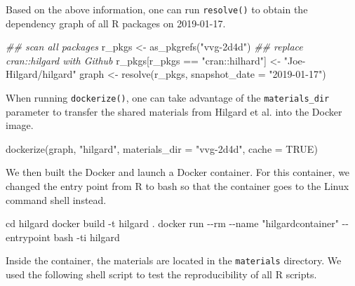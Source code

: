 \documentclass[
  10pt,
  letterpaper,
]{article}
\newenvironment{Shaded}{\begin{snugshade}}{\end{snugshade}}
\newcommand{\AttributeTok}[1]{\textcolor[rgb]{0.40,0.45,0.13}{#1}}
\newcommand{\ConstantTok}[1]{\textcolor[rgb]{0.56,0.35,0.01}{#1}}
\newcommand{\DocumentationTok}[1]{\textcolor[rgb]{0.37,0.37,0.37}{\textit{#1}}}
\newcommand{\FunctionTok}[1]{\textcolor[rgb]{0.28,0.35,0.67}{#1}}
\newcommand{\NormalTok}[1]{\textcolor[rgb]{0.00,0.23,0.31}{#1}}
\newcommand{\OtherTok}[1]{\textcolor[rgb]{0.00,0.23,0.31}{#1}}
\newcommand{\SpecialCharTok}[1]{\textcolor[rgb]{0.37,0.37,0.37}{#1}}
\newcommand{\StringTok}[1]{\textcolor[rgb]{0.13,0.47,0.30}{#1}}
\begin{document}
Based on the above information, one can run \texttt{resolve()} to obtain
the dependency graph of all R packages on 2019-01-17.

\begin{Shaded}
\begin{Highlighting}[]
\DocumentationTok{\#\# scan all packages}
\NormalTok{r\_pkgs }\OtherTok{\textless{}{-}} \FunctionTok{as\_pkgrefs}\NormalTok{(}\StringTok{"vvg{-}2d4d"}\NormalTok{)}
\DocumentationTok{\#\# replace cran::hilgard with Github}
\NormalTok{r\_pkgs[r\_pkgs }\SpecialCharTok{==} \StringTok{"cran::hilhard"}\NormalTok{] }\OtherTok{\textless{}{-}} \StringTok{"Joe{-}Hilgard/hilgard"}
\NormalTok{graph }\OtherTok{\textless{}{-}} \FunctionTok{resolve}\NormalTok{(r\_pkgs, }\AttributeTok{snapshot\_date =} \StringTok{"2019{-}01{-}17"}\NormalTok{)}
\end{Highlighting}
\end{Shaded}

When running \texttt{dockerize()}, one can take advantage of the
\texttt{materials\_dir} parameter to transfer the shared materials from
Hilgard et al. \citep{hilgard:2019:NEG} into the Docker image.

\begin{Shaded}
\begin{Highlighting}[]
\FunctionTok{dockerize}\NormalTok{(graph, }\StringTok{"hilgard"}\NormalTok{, }\AttributeTok{materials\_dir =} \StringTok{"vvg{-}2d4d"}\NormalTok{, }\AttributeTok{cache =} \ConstantTok{TRUE}\NormalTok{)}
\end{Highlighting}
\end{Shaded}

We then built the Docker and launch a Docker container. For this
container, we changed the entry point from R to bash so that the
container goes to the Linux command shell instead.

\begin{Shaded}
\begin{Highlighting}[]
\NormalTok{cd hilgard}
\NormalTok{docker build }\SpecialCharTok{{-}}\NormalTok{t hilgard .}
\NormalTok{docker run }\SpecialCharTok{{-}{-}}\NormalTok{rm }\SpecialCharTok{{-}{-}}\NormalTok{name }\StringTok{"hilgardcontainer"} \SpecialCharTok{{-}{-}}\NormalTok{entrypoint bash }\SpecialCharTok{{-}}\NormalTok{ti hilgard}
\end{Highlighting}
\end{Shaded}

Inside the container, the materials are located in the
\texttt{materials} directory. We used the following shell script to test
the reproducibility of all R scripts.
\end{document}
